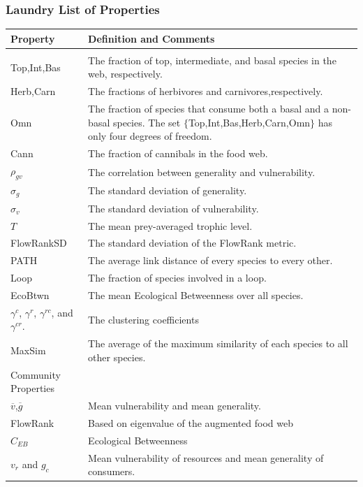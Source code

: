 \documentclass[table]{beamer}
\begin{document}
\begin{frame}
    \frametitle{Laundry List of Properties}
    \tiny
    \centering
    \begin{tabular}{l p{3in}}
        \toprule
        \rowcolor{white}Property & Definition and Comments\\
        \midrule
        \rowcolor{white}\multicolumn{2}{l}{Global and Comm. Props.}\\\cmidrule{1-1}
        Top,Int,Bas&The fraction of top, intermediate, and basal species in the
        web, respectively.\\
        Herb,Carn&The fractions of herbivores and carnivores,respectively.\\
        Omn&The fraction of species that consume both a basal and a non-basal
        species. The set $\{$Top,Int,Bas,Herb,Carn,Omn$\}$ has only
        four degrees of freedom.\\
        Cann&The fraction of cannibals in the food web.\\
        $\rho_{gv}$&The correlation between generality and vulnerability.\\
        $\sigma_{g}$&The standard deviation of generality.\\
        $\sigma_{v}$&The standard deviation of vulnerability.\\
        $T$&The mean prey-averaged trophic level.\\
        FlowRankSD&The standard deviation of the FlowRank metric.\\
        PATH&The average link distance of every species to every other.\\
        Loop&The fraction of species involved in a loop.\\
        EcoBtwn&The mean Ecological Betweenness over all species.\\
        $\gamma^{c}$, $\gamma^{r}$, $\gamma^{rc}$, and $\gamma^{cr}$.& The
        clustering coefficients \\
        MaxSim&The average of the maximum similarity of each species to all
        other species.\\
        \midrule
        \rowcolor{white}Community Properties\\\cmidrule{1-1}
        $\overline{v}$,$\overline{g}$&Mean vulnerability and mean generality.\\
        FlowRank&Based on eigenvalue of the augmented food web\\
        $C_{EB}$&Ecological Betweenness \\
        $v_r$ and $g_c$&Mean vulnerability of resources and mean generality of
        consumers.\\\bottomrule  
    \end{tabular}
\end{frame}
\end{document}
